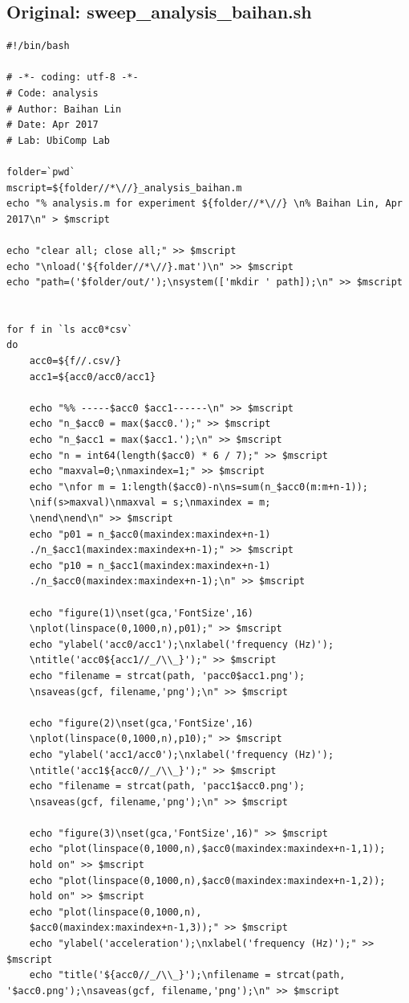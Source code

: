 \documentclass{sigchi}
\begin{document}
\subsection{Original: sweep\_analysis\_baihan.sh}\label{ss:swp_ana.sh}
\begin{lstlisting}
#!/bin/bash

# -*- coding: utf-8 -*-
# Code: analysis
# Author: Baihan Lin
# Date: Apr 2017
# Lab: UbiComp Lab

folder=`pwd`
mscript=${folder//*\//}_analysis_baihan.m
echo "% analysis.m for experiment ${folder//*\//} \n% Baihan Lin, Apr 2017\n" > $mscript

echo "clear all; close all;" >> $mscript
echo "\nload('${folder//*\//}.mat')\n" >> $mscript
echo "path=('$folder/out/');\nsystem(['mkdir ' path]);\n" >> $mscript


for f in `ls acc0*csv`
do
    acc0=${f//.csv/}
    acc1=${acc0/acc0/acc1}

	echo "%% -----$acc0 $acc1------\n" >> $mscript
    echo "n_$acc0 = max($acc0.');" >> $mscript
    echo "n_$acc1 = max($acc1.');\n" >> $mscript
    echo "n = int64(length($acc0) * 6 / 7);" >> $mscript
    echo "maxval=0;\nmaxindex=1;" >> $mscript
    echo "\nfor m = 1:length($acc0)-n\ns=sum(n_$acc0(m:m+n-1));
    \nif(s>maxval)\nmaxval = s;\nmaxindex = m;
    \nend\nend\n" >> $mscript
    echo "p01 = n_$acc0(maxindex:maxindex+n-1)
    ./n_$acc1(maxindex:maxindex+n-1);" >> $mscript
    echo "p10 = n_$acc1(maxindex:maxindex+n-1)
    ./n_$acc0(maxindex:maxindex+n-1);\n" >> $mscript

	echo "figure(1)\nset(gca,'FontSize',16)
    \nplot(linspace(0,1000,n),p01);" >> $mscript
	echo "ylabel('acc0/acc1');\nxlabel('frequency (Hz)');
    \ntitle('acc0${acc1//_/\\_}');" >> $mscript
	echo "filename = strcat(path, 'pacc0$acc1.png');
    \nsaveas(gcf, filename,'png');\n" >> $mscript

	echo "figure(2)\nset(gca,'FontSize',16)
    \nplot(linspace(0,1000,n),p10);" >> $mscript
	echo "ylabel('acc1/acc0');\nxlabel('frequency (Hz)');
    \ntitle('acc1${acc0//_/\\_}');" >> $mscript
	echo "filename = strcat(path, 'pacc1$acc0.png');
    \nsaveas(gcf, filename,'png');\n" >> $mscript

	echo "figure(3)\nset(gca,'FontSize',16)" >> $mscript
	echo "plot(linspace(0,1000,n),$acc0(maxindex:maxindex+n-1,1)); 
    hold on" >> $mscript
	echo "plot(linspace(0,1000,n),$acc0(maxindex:maxindex+n-1,2)); 
    hold on" >> $mscript
	echo "plot(linspace(0,1000,n),
    $acc0(maxindex:maxindex+n-1,3));" >> $mscript
	echo "ylabel('acceleration');\nxlabel('frequency (Hz)');" >> $mscript
	echo "title('${acc0//_/\\_}');\nfilename = strcat(path, '$acc0.png');\nsaveas(gcf, filename,'png');\n" >> $mscript


\end{lstlisting}
\end{document}
